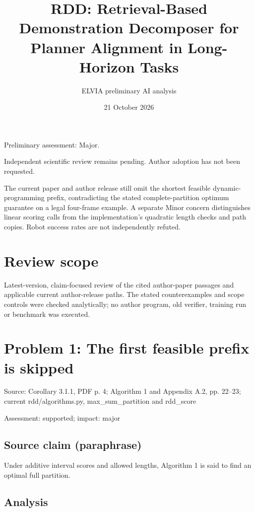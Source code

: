 \documentclass[11pt]{article}
\begin{document}
\title{RDD: Retrieval-Based Demonstration Decomposer for Planner Alignment in Long-Horizon Tasks}

\author{ELVIA preliminary AI analysis}\date{21 October 2026}\maketitle

Preliminary assessment: Major.\par

Independent scientific review remains pending. Author adoption has not been requested.

The current paper and author release still omit the shortest feasible dynamic-programming prefix, contradicting the stated complete-partition optimum guarantee on a legal four-frame example. A separate Minor concern distinguishes linear scoring calls from the implementation’s quadratic length checks and path copies. Robot success rates are not independently refuted.

\section*{Review scope}

Latest-version, claim-focused review of the cited author-paper passages and applicable current author-release paths. The stated counterexamples and scope controls were checked analytically; no author program, old verifier, training run or benchmark was executed.

\section*{Problem 1: The first feasible prefix is skipped}

Source: Corollary 3.1.1, PDF p. 4; Algorithm 1 and Appendix A.2, pp. 22–23; current rdd/algorithms.py, max\_sum\_partition and rdd\_score

Assessment: supported; impact: major

\subsection*{Source claim (paraphrase)}

Under additive interval scores and allowed lengths, Algorithm 1 is said to find an optimal full partition.

\subsection*{Analysis}
\end{document}
